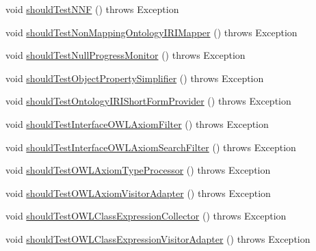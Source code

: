 \begin{DoxyCompactItemize}
\item 
void \hyperlink{classorg_1_1semanticweb_1_1owlapi_1_1contract_1_1_contract_owlapi_util_test_a6e66af8fe3a2e050437a32d87ea550ee}{should\-Test\-N\-N\-F} ()  throws Exception 
\item 
void \hyperlink{classorg_1_1semanticweb_1_1owlapi_1_1contract_1_1_contract_owlapi_util_test_a4e5f4a708bfc7a271e52466c5264a17b}{should\-Test\-Non\-Mapping\-Ontology\-I\-R\-I\-Mapper} ()  throws Exception 
\item 
void \hyperlink{classorg_1_1semanticweb_1_1owlapi_1_1contract_1_1_contract_owlapi_util_test_a0ad4fd82b684d5d7bed95ac0ccaedcb8}{should\-Test\-Null\-Progress\-Monitor} ()  throws Exception 
\item 
void \hyperlink{classorg_1_1semanticweb_1_1owlapi_1_1contract_1_1_contract_owlapi_util_test_ad92ae3393baa5e195820f878be33831b}{should\-Test\-Object\-Property\-Simplifier} ()  throws Exception 
\item 
void \hyperlink{classorg_1_1semanticweb_1_1owlapi_1_1contract_1_1_contract_owlapi_util_test_ae6c1be99761fcaf57acf844efc15c890}{should\-Test\-Ontology\-I\-R\-I\-Short\-Form\-Provider} ()  throws Exception 
\item 
void \hyperlink{classorg_1_1semanticweb_1_1owlapi_1_1contract_1_1_contract_owlapi_util_test_a3816b60330f6b283a7407619428511d7}{should\-Test\-Interface\-O\-W\-L\-Axiom\-Filter} ()  throws Exception 
\item 
void \hyperlink{classorg_1_1semanticweb_1_1owlapi_1_1contract_1_1_contract_owlapi_util_test_a81555a757d7a4d9e58c82e5e16c400ab}{should\-Test\-Interface\-O\-W\-L\-Axiom\-Search\-Filter} ()  throws Exception 
\item 
void \hyperlink{classorg_1_1semanticweb_1_1owlapi_1_1contract_1_1_contract_owlapi_util_test_a592c26f3ce2df398b5de77c542e0692e}{should\-Test\-O\-W\-L\-Axiom\-Type\-Processor} ()  throws Exception 
\item 
void \hyperlink{classorg_1_1semanticweb_1_1owlapi_1_1contract_1_1_contract_owlapi_util_test_ad766cf31d2a4e7c5aed1fdb732b75d7d}{should\-Test\-O\-W\-L\-Axiom\-Visitor\-Adapter} ()  throws Exception 
\item 
void \hyperlink{classorg_1_1semanticweb_1_1owlapi_1_1contract_1_1_contract_owlapi_util_test_aea07aa578074ea04e49835ff3ed0c4bd}{should\-Test\-O\-W\-L\-Class\-Expression\-Collector} ()  throws Exception 
\item 
void \hyperlink{classorg_1_1semanticweb_1_1owlapi_1_1contract_1_1_contract_owlapi_util_test_af08b36faa8a976b2ead2f320d612062f}{should\-Test\-O\-W\-L\-Class\-Expression\-Visitor\-Adapter} ()  throws Exception 

\end{DoxyCompactItemize}
